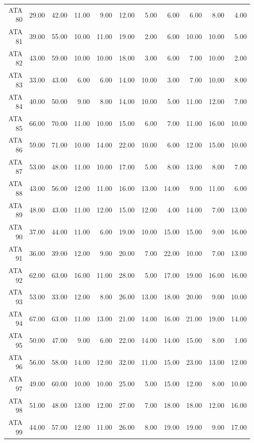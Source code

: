 \begin{landscape}
\begin{longtable}{rrrrrrrrrrr}
ATA 80 & 29.00 & 42.00 & 11.00 & 9.00 & 12.00 & 5.00 & 6.00 & 6.00 & 8.00 & 4.00 \\ 
  ATA 81 & 39.00 & 55.00 & 10.00 & 11.00 & 19.00 & 2.00 & 6.00 & 10.00 & 10.00 & 5.00 \\ 
  ATA 82 & 43.00 & 59.00 & 10.00 & 10.00 & 18.00 & 3.00 & 6.00 & 7.00 & 10.00 & 2.00 \\ 
  ATA 83 & 33.00 & 43.00 & 6.00 & 6.00 & 14.00 & 10.00 & 3.00 & 7.00 & 10.00 & 8.00 \\ 
  ATA 84 & 40.00 & 50.00 & 9.00 & 8.00 & 14.00 & 10.00 & 5.00 & 11.00 & 12.00 & 7.00 \\ 
  ATA 85 & 66.00 & 70.00 & 11.00 & 10.00 & 15.00 & 6.00 & 7.00 & 11.00 & 16.00 & 10.00 \\ 
  ATA 86 & 59.00 & 71.00 & 10.00 & 14.00 & 22.00 & 10.00 & 6.00 & 12.00 & 15.00 & 10.00 \\ 
  ATA 87 & 53.00 & 48.00 & 11.00 & 10.00 & 17.00 & 5.00 & 8.00 & 13.00 & 8.00 & 7.00 \\ 
  ATA 88 & 43.00 & 56.00 & 12.00 & 11.00 & 16.00 & 13.00 & 14.00 & 9.00 & 11.00 & 6.00 \\ 
  ATA 89 & 48.00 & 43.00 & 11.00 & 12.00 & 15.00 & 12.00 & 4.00 & 14.00 & 7.00 & 13.00 \\ 
  ATA 90 & 37.00 & 44.00 & 11.00 & 6.00 & 19.00 & 10.00 & 15.00 & 15.00 & 9.00 & 16.00 \\ 
  ATA 91 & 36.00 & 39.00 & 12.00 & 9.00 & 20.00 & 7.00 & 22.00 & 10.00 & 7.00 & 13.00 \\ 
  ATA 92 & 62.00 & 63.00 & 16.00 & 11.00 & 28.00 & 5.00 & 17.00 & 19.00 & 16.00 & 16.00 \\ 
  ATA 93 & 53.00 & 33.00 & 12.00 & 8.00 & 26.00 & 13.00 & 18.00 & 20.00 & 9.00 & 10.00 \\ 
  ATA 94 & 67.00 & 63.00 & 11.00 & 13.00 & 21.00 & 14.00 & 16.00 & 21.00 & 19.00 & 14.00 \\ 
  ATA 95 & 50.00 & 47.00 & 9.00 & 6.00 & 22.00 & 14.00 & 14.00 & 15.00 & 8.00 & 1.00 \\ 
  ATA 96 & 56.00 & 58.00 & 14.00 & 12.00 & 32.00 & 11.00 & 15.00 & 23.00 & 13.00 & 12.00 \\ 
  ATA 97 & 49.00 & 60.00 & 10.00 & 10.00 & 25.00 & 5.00 & 15.00 & 12.00 & 8.00 & 10.00 \\ 
  ATA 98 & 51.00 & 48.00 & 13.00 & 12.00 & 27.00 & 7.00 & 18.00 & 18.00 & 12.00 & 16.00 \\ 
  ATA 99 & 44.00 & 57.00 & 12.00 & 11.00 & 26.00 & 8.00 & 19.00 & 19.00 & 9.00 & 17.00 \\ 

\end{longtable}
\end{landscape}
